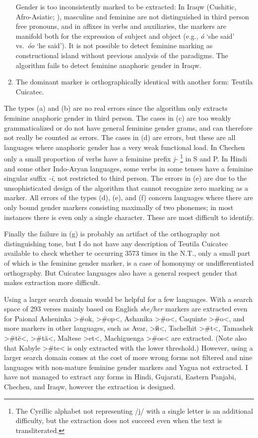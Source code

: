 \documentclass[output=collectionpaper]{langsci/langscibook}
\begin{document}
\begin{enumerate}[label=(\alph*)]
Gender is too inconsistently marked to be extracted: In Iraqw (Cushitic, Afro-Asiatic; \citealt{Mous1992}), masculine and feminine are not distinguished in third person free pronouns, and in affixes in verbs and auxiliaries, the markers are manifold both for the expression of subject and object (e.g., \textit{ó\textquotesingle} ‘she said’ vs.\ \textit{óo\textquotesingle} ‘he said’). It is not possible to detect feminine marking as constructional island without previous analysis of the paradigms. The algorithm fails to detect feminine anaphoric gender in Iraqw.
\item
The dominant marker is orthographically identical with another form: Teutila Cuicatec.
\end{enumerate}

The types (a) and (b) are no real errors since the algorithm only extracts feminine anaphoric gender in third person. The cases in (c) are too weakly grammaticalized or do not have general feminine gender grams, and can therefore not really be counted as errors. The cases in (d) are errors, but these are all languages where anaphoric gender has a very weak functional load. In Chechen only a small proportion of verbs have a feminine prefix \textit{j-}%
\footnote{%
The Cyrillic alphabet not representing /j/ with a single letter is an additional difficulty, but the extraction does not succeed even when the text is transliterated.
} %
in S and P. In Hindi and some other Indo-Aryan languages, some verbs in some tenses have a feminine singular suffix \textit{-ī}, not restricted to third person. The errors in (e) are due to the unsophisticated design of the algorithm that cannot recognize zero marking as a marker. All errors of the types (d), (e), and (f) concern languages where there are only bound gender markers consisting maximally of two phonemes; in most instances there is even only a single character. These are most difficult to identify.

Finally the failure in (g) is probably an artifact of the orthography not distinguishing tone, but I do not have any description of Teutila Cuicatec available to check whether te occurring 3573 times in the N.T., only a small part of which is the feminine gender marker, is a case of homonymy or undifferentiated orthography. But Cuicatec languages also have a general respect gender that makes extraction more difficult.

Using a larger search domain would be helpful for a few languages. With a search space of 293 verses mainly based on English \textit{she/her} markers are extracted even for Paional Asheninka >\#ok, >\#op<, Ashanika >\#o<, Caquinte >\#o<, and more markers in other languages, such as Avar, >й<, Tachelhit >\#t<, Tamashek >\#tĕ<, >\#tă<, Maltese >et<, Machiguenga >\#os< are extracted. (Note also that Kabyle >\#te< is only extracted with the lower threshold.) However, using a larger search domain comes at the cost of more wrong forms not filtered and nine languages with non-mature feminine gender markers and Yagua not extracted. I have not managed to extract any forms in Hindi, Gujarati, Eastern Panjabi, Chechen, and Iraqw, however the extraction is designed.
\end{document}
